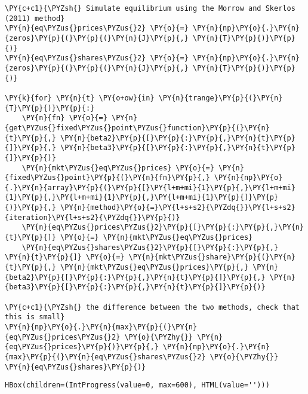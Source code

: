     \begin{tcolorbox}[breakable, size=fbox, boxrule=1pt, pad at break*=1mm,colback=cellbackground, colframe=cellborder]
\begin{Verbatim}[commandchars=\\\{\}]
\PY{c+c1}{\PYZsh{} Simulate equilibrium using the Morrow and Skerlos (2011) method}
\PY{n}{eq\PYZus{}prices\PYZus{}2} \PY{o}{=} \PY{n}{np}\PY{o}{.}\PY{n}{zeros}\PY{p}{(}\PY{p}{(}\PY{n}{J}\PY{p}{,} \PY{n}{T}\PY{p}{)}\PY{p}{)}
\PY{n}{eq\PYZus{}shares\PYZus{}2} \PY{o}{=} \PY{n}{np}\PY{o}{.}\PY{n}{zeros}\PY{p}{(}\PY{p}{(}\PY{n}{J}\PY{p}{,} \PY{n}{T}\PY{p}{)}\PY{p}{)}

\PY{k}{for} \PY{n}{t} \PY{o+ow}{in} \PY{n}{trange}\PY{p}{(}\PY{n}{T}\PY{p}{)}\PY{p}{:}
    \PY{n}{fn} \PY{o}{=} \PY{n}{get\PYZus{}fixed\PYZus{}point\PYZus{}function}\PY{p}{(}\PY{n}{t}\PY{p}{,} \PY{n}{beta2}\PY{p}{[}\PY{p}{:}\PY{p}{,}\PY{n}{t}\PY{p}{]}\PY{p}{,} \PY{n}{beta3}\PY{p}{[}\PY{p}{:}\PY{p}{,}\PY{n}{t}\PY{p}{]}\PY{p}{)}
    \PY{n}{mkt\PYZus{}eq\PYZus{}prices} \PY{o}{=} \PY{n}{fixed\PYZus{}point}\PY{p}{(}\PY{n}{fn}\PY{p}{,} \PY{n}{np}\PY{o}{.}\PY{n}{array}\PY{p}{(}\PY{p}{[}\PY{l+m+mi}{1}\PY{p}{,}\PY{l+m+mi}{1}\PY{p}{,}\PY{l+m+mi}{1}\PY{p}{,}\PY{l+m+mi}{1}\PY{p}{]}\PY{p}{)}\PY{p}{,} \PY{n}{method}\PY{o}{=}\PY{l+s+s2}{\PYZdq{}}\PY{l+s+s2}{iteration}\PY{l+s+s2}{\PYZdq{}}\PY{p}{)}
    \PY{n}{eq\PYZus{}prices\PYZus{}2}\PY{p}{[}\PY{p}{:}\PY{p}{,}\PY{n}{t}\PY{p}{]} \PY{o}{=} \PY{n}{mkt\PYZus{}eq\PYZus{}prices}
    \PY{n}{eq\PYZus{}shares\PYZus{}2}\PY{p}{[}\PY{p}{:}\PY{p}{,} \PY{n}{t}\PY{p}{]} \PY{o}{=} \PY{n}{mkt\PYZus{}share}\PY{p}{(}\PY{n}{t}\PY{p}{,} \PY{n}{mkt\PYZus{}eq\PYZus{}prices}\PY{p}{,} \PY{n}{beta2}\PY{p}{[}\PY{p}{:}\PY{p}{,}\PY{n}{t}\PY{p}{]}\PY{p}{,} \PY{n}{beta3}\PY{p}{[}\PY{p}{:}\PY{p}{,}\PY{n}{t}\PY{p}{]}\PY{p}{)}

\PY{c+c1}{\PYZsh{} the difference between the two methods, check that this is small}
\PY{n}{np}\PY{o}{.}\PY{n}{max}\PY{p}{(}\PY{n}{eq\PYZus{}prices\PYZus{}2} \PY{o}{\PYZhy{}} \PY{n}{eq\PYZus{}prices}\PY{p}{)}\PY{p}{,} \PY{n}{np}\PY{o}{.}\PY{n}{max}\PY{p}{(}\PY{n}{eq\PYZus{}shares\PYZus{}2} \PY{o}{\PYZhy{}} \PY{n}{eq\PYZus{}shares}\PY{p}{)}
\end{Verbatim}
\end{tcolorbox}


    \begin{verbatim}
HBox(children=(IntProgress(value=0, max=600), HTML(value='')))
    \end{verbatim}


